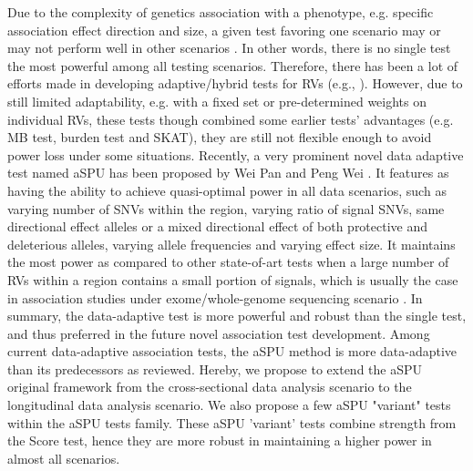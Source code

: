 \documentclass[12pt]{article}
\begin{document}
Due to the complexity of genetics association with a phenotype, e.g. specific association effect direction and size, a given test favoring one scenario may or may not perform well in other scenarios \cite{Pan2009,Derkach2013,pan2014powerful,Sun2013}. In other words, there is no single test the most powerful among all testing scenarios. Therefore, there has been a lot of efforts made in developing adaptive/hybrid tests for RVs (e.g., \cite{Derkach2013,Chen2012,Han2010,Lee2012,Lin2011,Pan2011,Sun2013,Zhang2011}). However, due to still limited adaptability, e.g. with a fixed set or pre-determined weights on individual RVs, these tests though combined some earlier tests' advantages (e.g. MB test, burden test and SKAT), they are still not flexible enough to avoid power loss under some situations. Recently, a very prominent novel data adaptive test named aSPU has been proposed by Wei Pan and Peng Wei \cite{pan2014powerful}. It features as having the ability to achieve quasi-optimal power in all data scenarios, such as varying number of SNVs within the region, varying ratio of signal SNVs, same directional effect alleles or a mixed directional effect of both protective and deleterious alleles, varying allele frequencies and varying effect size. It maintains the most power as compared to other state-of-art tests when a large number of RVs within a region contains a small portion of signals, which is usually the case in association studies under exome/whole-genome sequencing scenario \cite{pan2014powerful}. In summary, the data-adaptive test is more powerful and robust than the single test, and thus preferred in the future novel association test development. Among current data-adaptive association tests, the aSPU method is more data-adaptive than its predecessors as reviewed. Hereby, we propose to extend the aSPU original framework from the cross-sectional data analysis scenario to the longitudinal data analysis scenario. We also propose a few aSPU "variant" tests within the aSPU tests family. These aSPU 'variant' tests combine strength from the Score test, hence they are more robust in maintaining a higher power in almost all scenarios.
\end{document}
